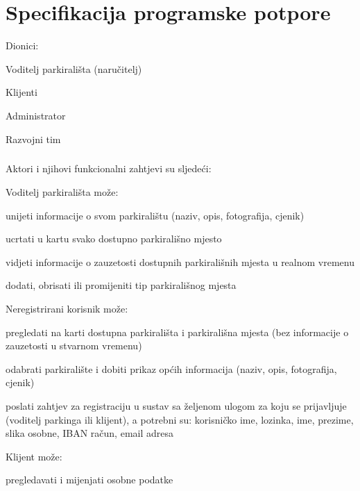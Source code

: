 
\chapter{Specifikacija programske potpore}

{Dionici: \begin{packed_enum}
		\item {Voditelj parkirališta (naručitelj)}
		\item {Klijenti}
		\item {Administrator}
		\item {Razvojni tim}
	\end{packed_enum}       
	
	\paragraph*{}{Aktori i njihovi funkcionalni zahtjevi su sljedeći:
	}\begin{packed_enum}
		\item {Voditelj parkirališta može:}
		\begin{packed_item}
			\item {unijeti informacije o svom parkiralištu (naziv, opis, fotografija, cjenik)}
			\item {ucrtati u kartu svako dostupno parkirališno mjesto}
			\item {vidjeti informacije o zauzetosti dostupnih parkirališnih mjesta u realnom vremenu}
			\item {dodati, obrisati ili promijeniti tip parkirališnog mjesta}
		\end{packed_item}
		\item {Neregistrirani korisnik može:}
		\begin{packed_item}
			\item {pregledati na karti dostupna parkirališta i parkirališna mjesta (bez informacije o zauzetosti u stvarnom vremenu)}
			\item {odabrati parkiralište i dobiti prikaz općih informacija (naziv, opis, fotografija, cjenik)}
			\item {poslati zahtjev za registraciju u sustav sa željenom ulogom za koju se prijavljuje (voditelj parkinga ili klijent), a potrebni su: korisničko ime, lozinka, ime, prezime, slika osobne, IBAN račun, email adresa}
		\end{packed_item}
		\item {Klijent može:}
		\begin{packed_item}
			\item {pregledavati i mijenjati osobne podatke}

\end{packed_item}
\end{packed_enum}}
